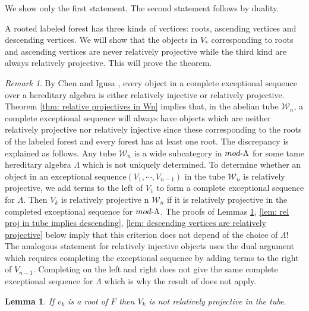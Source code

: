 \documentclass[11pt]{amsart}
\newtheorem{lem}[thm]{Lemma}
\theoremstyle{definition}
\theoremstyle{remark}
\newtheorem{rem}[thm]{Remark}
\numberwithin{equation}{section}
\newcommand{\cW}{\ensuremath{{\mathcal{W}}}}
\begin{document}
We show only the first statement. The second statement follows by duality. 

A rooted labeled forest has three kinds of vertices: roots, ascending vertices and descending vertices. We will show that the objects in $V_\ast$ corresponding to roots and ascending vertices are never relatively projective while the third kind are always relatively projective. This will prove the theorem.

\begin{rem}\label{rem: discrepancy with Chen-Igusa theorem} By Chen and Igusa \cite{CI}, every object in a complete exceptional sequence over a hereditary algebra is either relatively injective or relatively projective. Theorem \ref{thm: relative projectives in Wn} implies that, in the abelian tube $\cW_n$, a complete exceptional sequence will always have objects which are neither relatively projective nor relatively injective since these corresponding to the roots of the labeled forest and every forest has at least one root. The discrepancy is explained as follows. Any tube $\cW_n$ is a wide subcategory in $mod\text-\Lambda$ for some tame hereditary algebra $\Lambda$ which is not uniquely determined.
To determine whether an object in an exceptional sequence$(V_1,\cdots,V_{n-1})$  in the tube $\cW_n$ is relatively projective, we add terms to the left of $V_1$ to form a complete exceptional sequence for $\Lambda$. Then $V_k$ is relatively projective n $\cW_n$ if it is relatively projective in the completed exceptional sequence for $mod\text-\Lambda$. The proofs of Lemmas \ref{lem: roots are not projective in tubes}, \ref{lem: rel proj in tube implies descending}, \ref{lem: descending vertices are relatively projective} below imply that this criterion does not depend of the choice of $\Lambda$! The analogous statement for relatively injective objects uses the dual argument which requires completing the exceptional sequence by adding terms to the right of $V_{n-1}$. Completing on the left and right does not give the same complete exceptional sequence for $\Lambda$ which is why the result of \cite{CI} does not apply.
\end{rem}


\begin{lem}\label{lem: roots are not projective in tubes}
If $v_k$ is a root of $F$ then $V_k$ is not relatively projective in the tube.
\end{lem}
\end{document}
